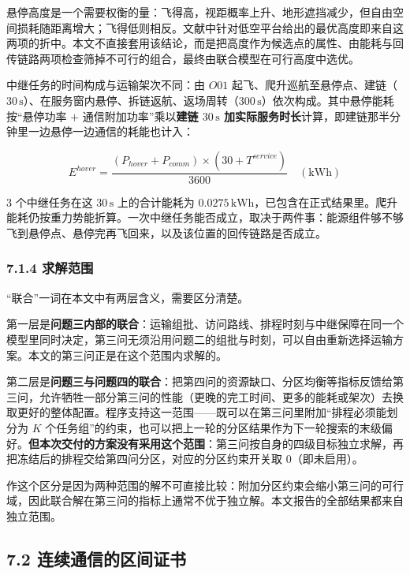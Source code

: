 \documentclass[withoutpreface,bwprint]{format}
\begin{document}
悬停高度是一个需要权衡的量：飞得高，视距概率上升、地形遮挡减少，但自由空间损耗随距离增大；飞得低则相反。文献中针对低空平台给出的最优高度即来自这两项的折中\cite{alhourani2014}。本文不直接套用该结论，而是把高度作为候选点的属性、由能耗与回传链路两项检查筛掉不可行的组合，最终由联合模型在可行高度中选优。

中继任务的时间构成与运输架次不同：由 $O01$ 起飞、爬升巡航至悬停点、建链（$30\,\text{s}$）、在服务窗内悬停、拆链返航、返场周转（$300\,\text{s}$）依次构成。其中悬停能耗按“悬停功率 $+$ 通信附加功率”乘以\textbf{建链 $30\,\text{s}$ 加实际服务时长}计算，即建链那半分钟里一边悬停一边通信的耗能也计入：

\begin{equation}
E^{hover} = \frac{(P_{hover} + P_{comm}) \times (30 + T^{service})}{3600} \quad (\text{kWh})
\end{equation}

3 个中继任务在这 $30\,\text{s}$ 上的合计能耗为 $0.0275\,\text{kWh}$，已包含在正式结果里。爬升能耗仍按重力势能折算。一次中继任务能否成立，取决于两件事：能源组件够不够飞到悬停点、悬停完再飞回来，以及该位置的回传链路是否成立。

\subsubsection{7.1.4 求解范围}
“联合”一词在本文中有两层含义，需要区分清楚。

第一层是\textbf{问题三内部的联合}：运输组批、访问路线、排程时刻与中继保障在同一个模型里同时决定，第三问无须沿用问题二的组批与时刻，可以自由重新选择运输方案。本文的第三问正是在这个范围内求解的。

第二层是\textbf{问题三与问题四的联合}：把第四问的资源缺口、分区均衡等指标反馈给第三问，允许牺牲一部分第三问的性能（更晚的完工时间、更多的能耗或架次）去换取更好的整体配置。程序支持这一范围——既可以在第三问里附加“排程必须能划分为 $K$ 个任务组”的约束，也可以把上一轮的分区结果作为下一轮搜索的末级偏好。\textbf{但本次交付的方案没有采用这个范围}：第三问按自身的四级目标独立求解，再把冻结后的排程交给第四问分区，对应的分区约束开关取 0（即未启用）。

作这个区分是因为两种范围的解不可直接比较：附加分区约束会缩小第三问的可行域，因此联合解在第三问的指标上通常不优于独立解。本文报告的全部结果都来自独立范围。

\subsection{7.2 连续通信的区间证书}
\end{document}
